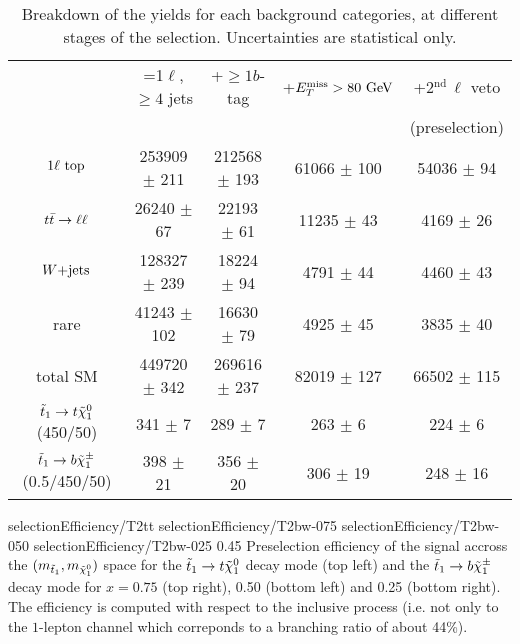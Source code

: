         \begin{table}[h!]
            \hspace*{-0.3cm}
            \begin{tabular}{|c|cccc|}
                \hline
                                             & =1$\ell$, $\geq 4$ jets   & +$\geq 1b$-tag     & +$E_T^\text{miss} > 80 ~\text{GeV}$ &  +2$^\text{nd}\, \ell$ veto \\
                                             &                           &                    &                   & (preselection) \\
                \hline
                $1\ell~\text{top}$              & 253909 $\pm$ 211          & 212568 $\pm$ 193   &  61066 $\pm$ 100  & 54036 $\pm$ 94     \\
                $t\bar{t} \rightarrow \ell \ell$               &  26240 $\pm$ 67           &  22193 $\pm$ 61    &  11235 $\pm$ 43   &  4169 $\pm$ 26     \\
                $\text{$W$+jets}$                     & 128327 $\pm$ 239          &  18224 $\pm$ 94    &   4791 $\pm$ 44   &  4460 $\pm$ 43     \\
                rare                         &  41243 $\pm$ 102          &  16630 $\pm$ 79    &   4925 $\pm$ 45   &  3835 $\pm$ 40     \\
                \hline
                total SM                     & 449720 $\pm$ 342          & 269616 $\pm$ 237   &  82019 $\pm$ 127  & 66502 $\pm$ 115    \\
                \hline
$\tilde{t}_1 \rightarrow t \tilde{\chi}_1^0$   (450/50) & 341 $\pm$ 7               & 289 $\pm$ 7        & 263 $\pm$ 6       & 224 $\pm$ 6        \\
$\tilde{t}_1 \rightarrow b \tilde{\chi}_1^\pm$ (0.5/450/50) & 398 $\pm$ 21              & 356 $\pm$ 20       & 306 $\pm$ 19      & 248 $\pm$ 16       \\
                \hline
            \end{tabular}
            \caption{Breakdown of the yields for each background categories, at different stages of the selection. Uncertainties are statistical only.}
            \label{tab:cutflowPreselection}
        \end{table}

                          {selectionEfficiency/T2tt}
                          {selectionEfficiency/T2bw-075}
                          {selectionEfficiency/T2bw-050}
                          {selectionEfficiency/T2bw-025}
                          {0.45}
                          {Preselection efficiency of the signal accross the $(m_{\tilde{t}_1},
                          m_{\tilde{\chi}_1^0})$ space for the $\tilde{t}_1 \rightarrow t \tilde{\chi}_1^0$
                          decay mode (top left) and the $\tilde{t}_1 \rightarrow b \tilde{\chi}_1^\pm$
                          decay mode for $x = 0.75$ (top right), 0.50 (bottom left) and 0.25
                          (bottom right). The efficiency is computed with respect to the
                          inclusive process (i.e. not only to the $1$-lepton channel which
                          correponds to a branching ratio of about 44\%).}


